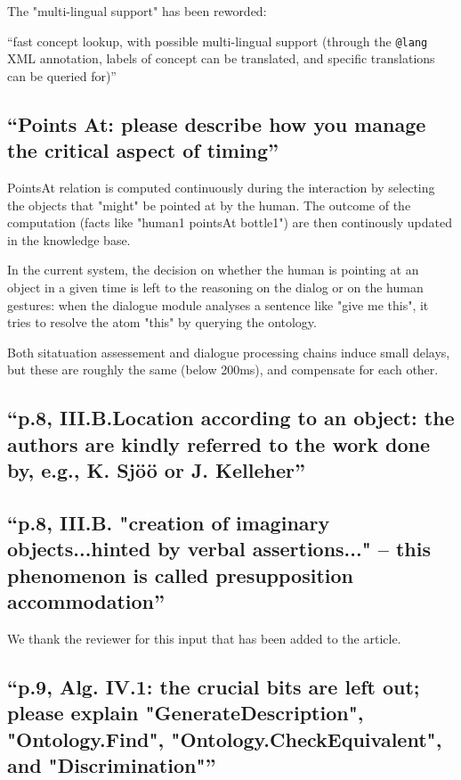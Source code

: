 \documentclass{article}
\begin{document}
The "multi-lingual support" has been reworded:

``fast concept lookup, with possible multi-lingual support (through the
{\tt @lang} XML annotation, labels of concept can be translated, and
specific translations can be queried for)''


\subsection{``Points At: please describe how you manage the critical aspect of
timing''}

PointsAt relation is computed continuously during the interaction by 
selecting the objects that "might" be pointed at by the human. The outcome
of the computation (facts like "human1 pointsAt bottle1") are then
continously updated in the knowledge base.

In the current system, the decision on whether the human is pointing at an 
object in a given time is left to the reasoning on the dialog or on the human gestures:
when the dialogue module analyses a sentence like "give me this", it tries to
resolve the atom "this" by querying the ontology.

Both sitatuation assessement and dialogue processing chains induce 
small delays, but these are roughly the same (below 200ms), and 
compensate for each other.

\subsection{``p.8, III.B.Location according to an object: the authors are
kindly referred to the work done by, e.g., K. Sjöö or J. Kelleher''}

\subsection{``p.8, III.B. "creation of imaginary objects...hinted by verbal
assertions..." -- this phenomenon is called presupposition accommodation''}

We thank the reviewer for this input that has been added to the article.

\subsection{``p.9, Alg. IV.1: the crucial bits are left out; please explain
"GenerateDescription", "Ontology.Find", "Ontology.CheckEquivalent", and
"Discrimination"''}
\end{document}
